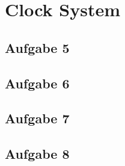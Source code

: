 \chapter{Clock System}

\section{Aufgabe 5}

\section{Aufgabe 6}

\section{Aufgabe 7}

\section{Aufgabe 8}

